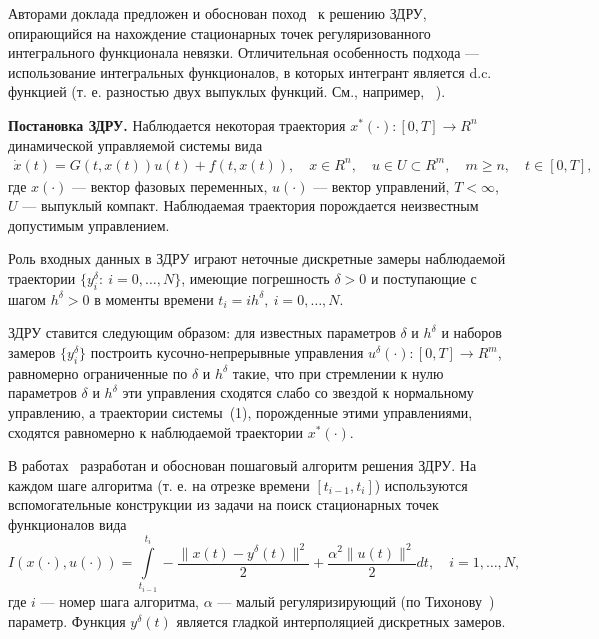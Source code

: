 Авторами доклада предложен и обоснован поход~\cite{Subbotina:uran,Subbotina:mian} к решению ЗДРУ, опирающийся на нахождение стационарных точек регуляризованного~\cite{Subbotina:tikh} интегрального функционала невязки. Отличительная особенность подхода --- использование интегральных функционалов, в которых интегрант является d.c. функцией (т. е. разностью двух выпуклых функций. См., например, ~\cite{Subbotina:strek}).

\textbf{Постановка ЗДРУ.}
Наблюдается некоторая траектория $x^*(\cdot):[0,T]\to R^n$ динамической управляемой системы вида
\begin{equation}
\begin{gathered}
\dot x(t) = G(t,x(t))u(t) + f(t,x(t)),\quad x\in R^n,\quad u\in U\subset  R^m,\quad m\geq n,\quad t\in[0,T],
\end{gathered}
\end{equation}
где $x(\cdot)$ --- вектор фазовых переменных, $u(\cdot)$ --- вектор управлений, $T<\infty$, $U$ --- выпуклый компакт. Наблюдаемая траектория порождается неизвестным допустимым управлением.

Роль входных данных в ЗДРУ играют неточные дискретные замеры наблюдаемой траектории $\{y_i^\delta:\ i=0,\ldots,N\}$, имеющие погрешность $\delta>0$ и поступающие с шагом $h^\delta>0$ в моменты времени $t_i=i h^\delta,\ i=0,\ldots,N$.

ЗДРУ ставится следующим образом: для известных параметров $\delta$ и $h^\delta$ и наборов замеров $\{y_i^\delta\}$ построить кусочно-непрерывные управления $u^\delta(\cdot): [0,T]\to R^m$, равномерно ограниченные по $\delta$ и $h^\delta$ такие, что при стремлении к нулю параметров $\delta$ и $h^\delta$ эти управления сходятся слабо со звездой к нормальному управлению, а траектории системы~(1), порожденные этими управлениями, сходятся равномерно к наблюдаемой траектории $x^*(\cdot)$.

В работах~\cite{Subbotina:uran,Subbotina:mian} разработан и обоснован пошаговый алгоритм решения ЗДРУ. На каждом шаге алгоритма (т. е. на отрезке времени $[t_{i-1},t_i]$) используются вспомогательные конструкции из задачи на поиск стационарных точек функционалов вида
\begin{equation}
I(x(\cdot),u(\cdot)) = \int \limits_{t_{i-1}}^{t_i}
 -\frac{\|x(t) - y^\delta(t)\|^2}{2}+\frac{\alpha^2\|u(t)\|^2}{2}dt,\quad i=1,\ldots,N,
\end{equation}
где $i$ --- номер шага алгоритма, $\alpha$ --- малый регуляризирующий (по Тихонову~\cite{Subbotina:tikh}) параметр. Функция $y^\delta(t)$ является гладкой интерполяцией дискретных замеров.

